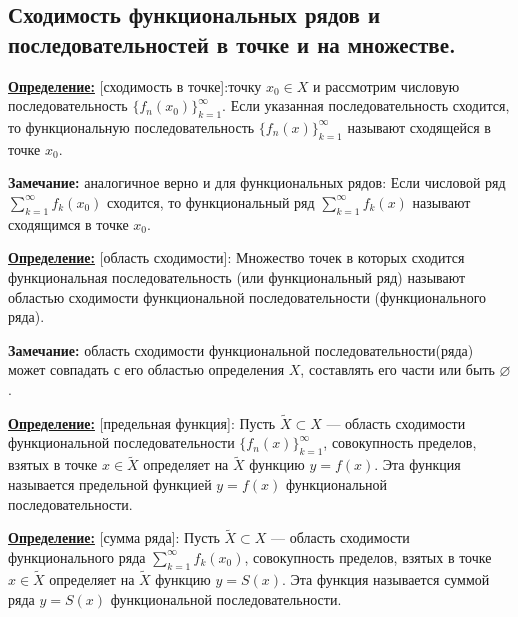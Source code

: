 \documentclass[a4paper,12pt]{article} %
\begin{document}
\subsection{Сходимость функциональных рядов и последовательностей в точке и на множестве.}

\underline{\textbf{Определение:}} [сходимость в точке]: точку $x_0 \in X$ и рассмотрим числовую последовательность $\{f_n(x_0)\}_{k=1}^\infty$. Если указанная последовательность сходится, то функциональную последовательность $\{f_n(x)\}_{k=1}^\infty$ называют сходящейся в точке $x_0$. \newline \newline

\textbf{Замечание:} аналогичное верно и для функциональных рядов: Если числовой ряд $\sum\limits_{k = 1}^{\infty}  f_k(x_0)$ сходится, то функциональный ряд  $\sum\limits_{k = 1}^{\infty}  f_k(x)$ называют сходящимся в точке $x_0$. \newline

\underline{\textbf{Определение:}} [область сходимости]:\newline
Множество точек в которых сходится функциональная последовательность (или функциональный ряд) называют областью сходимости функциональной последовательности (функционального ряда). \newline 

\textbf{Замечание:} область сходимости функциональной последовательности(ряда) может совпадать с его областью определения $X$, составлять его части или быть $\varnothing$. \newline

\underline{\textbf{Определение:}} [предельная функция]:\newline
Пусть $\widetilde{X} \subset X$ ---  область сходимости функциональной последовательности $\{f_n(x)\}_{k=1}^\infty$, совокупность пределов, взятых в точке $x\in \widetilde{X}$ определяет на $\widetilde{X}$ функцию $y = f(x)$. Эта функция называется предельной функцией $y = f(x) $ функциональной последовательности. \newline

\noindent \underline{\textbf{Определение:}} [сумма ряда]:\newline
Пусть $\widetilde{X} \subset X$ ---  область сходимости функционального ряда  $\sum\limits_{k = 1}^{\infty}  f_k(x_0)$, совокупность пределов, взятых в точке $x\in \widetilde{X}$ определяет на $\widetilde{X}$ функцию $y = S(x)$. Эта функция называется суммой ряда  $y = S(x) $ функциональной последовательности.\\
\end{document}
